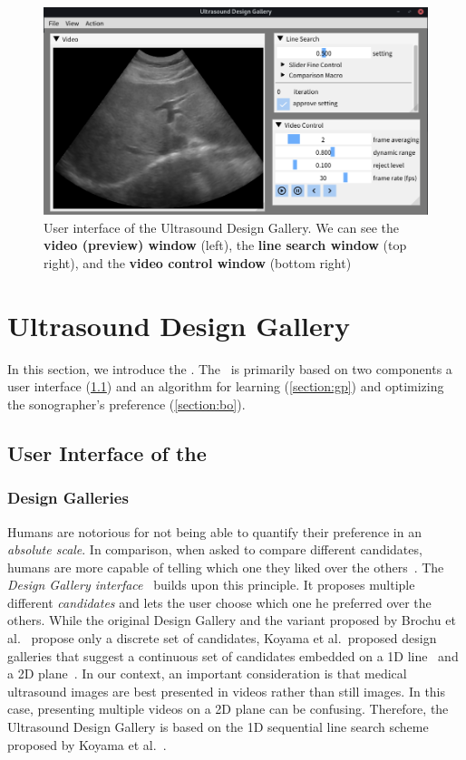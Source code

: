 
\begin{figure}[th]
  \centering
  \includegraphics[scale=0.30]{figures/ui.png}
  \caption{User interface of the Ultrasound Design Gallery. We can see the \textbf{video (preview) window} (left), the \textbf{line search window} (top right), and the \textbf{video control window} (bottom right) }\label{fig:ui}
\end{figure}

\section{Ultrasound Design Gallery}\label{section:usdg}

In this section, we introduce the \usdg.
The \usdg~is primarily based on two components a user interface (\cref{section:ui}) and an algorithm for learning (\cref{section:gp}) and optimizing the sonographer's preference (\cref{section:bo}).

\subsection{User Interface of the \usdg}\label{section:ui}
\subsubsection{Design Galleries}
Humans are notorious for not being able to quantify their preference in an \textit{absolute scale}.
In comparison, when asked to compare different candidates, humans are more capable of telling which one they liked over the others~\cite{10.2307/27821441, NIPS2007_b6a1085a}.
The \textit{Design Gallery interface}~\cite{10.1145/258734.258887} builds upon this principle.
It proposes multiple different \textit{candidates} and lets the user choose which one he preferred over the others.
While the original Design Gallery and the variant proposed by Brochu et al.~\cite{brochu_bayesian_2010} propose only a discrete set of candidates, Koyama et al.~proposed design galleries that suggest a continuous set of candidates embedded on a 1D line~\cite{10.1145/3072959.3073598} and a 2D plane~\cite{koyama_sequential_2020}.
In our context, an important consideration is that medical ultrasound images are best presented in videos rather than still images.
In this case, presenting multiple videos on a 2D plane can be confusing.
Therefore, the Ultrasound Design Gallery is based on the 1D sequential line search scheme proposed by Koyama et al.~\cite{10.1145/3072959.3073598}.

